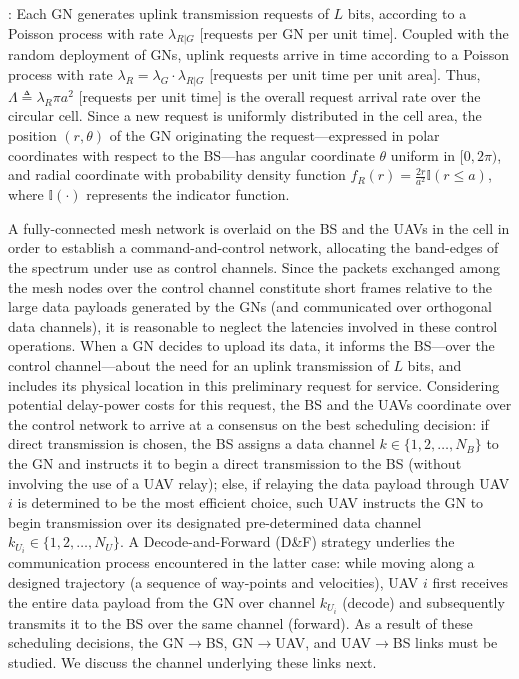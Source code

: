 \documentclass[12pt, draftcls, onecolumn]{IEEEtran}
\theoremstyle{plain}
\theoremstyle{definition}
\theoremstyle{remark}
\begin{document}
: Each GN generates uplink transmission requests of $L$ bits, according to a Poisson process with rate $\lambda_{R{|}G}$ [requests per GN per unit time]. Coupled with the random deployment of GNs, uplink requests arrive in time according to a Poisson process with rate $\lambda_{R}{=}\lambda_{G}{\cdot}\lambda_{R{|}G}$ [requests per unit time per unit area]. Thus, $\Lambda{\triangleq}\lambda_{R}\pi a^{2}$ [requests per unit time] is the overall request arrival rate over the circular cell. Since a new request is uniformly distributed in the cell area, the position $(r,\theta)$ of the GN originating the request---expressed in polar coordinates with respect to the BS---has angular coordinate $\theta$ uniform in $[0,2\pi)$, and radial coordinate with probability density function $f_{R}(r){=}\frac{2r}{a^2}\mathbb{I}(r{\leq}a)$, where $\mathbb{I}(\cdot)$ represents the indicator function. 

A fully-connected mesh network is overlaid on the BS and the UAVs in the cell in order to establish a command-and-control network, allocating the band-edges of the spectrum under use as control channels. Since the packets exchanged among the mesh nodes over the control channel constitute short frames relative to the large data payloads generated by the GNs (and communicated over orthogonal data channels), it is reasonable to neglect the latencies involved in these control operations. When a GN decides to upload its data, it informs the BS---over the control channel---about the need for an uplink transmission of $L$ bits, and includes its physical location in this preliminary request for service. Considering potential delay-power costs for this request, the BS and the UAVs coordinate over the control network to arrive at a consensus on the best scheduling decision: if direct transmission is chosen, the BS assigns a data channel $k{\in}\{1,2,{\dots},N_{B}\}$ to the GN and instructs it to begin a direct transmission to the BS (without involving the use of a UAV relay); else, if relaying the data payload through UAV $i$ is determined to be the most efficient choice, such UAV instructs the GN to begin transmission over its designated pre-determined data channel $k_{U_{i}}{\in}\{1,2,{\dots},N_{U}\}$. A {Decode-and-Forward} (D\&F) strategy underlies the communication process encountered in the latter case: while moving along a designed trajectory (a sequence of way-points and velocities), UAV $i$ first receives the entire data payload from the GN over channel $k_{U_{i}}$ ({decode}) and subsequently transmits it to the BS over the same channel ({forward}). As a result of these scheduling decisions, the GN$\rightarrow$BS, GN$\rightarrow$UAV, and UAV$\rightarrow$BS links must be studied. We discuss the channel underlying these links next.
\end{document}
